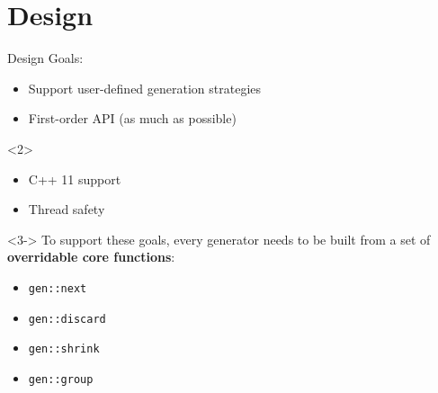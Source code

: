 \section{Design}

\begin{frame}[t]{\halcheck{} \textemdash{} Design}
  Goals:
  \begin{itemize}
    \item Support user-defined generation strategies
    \item First-order API (as much as possible)
  \end{itemize}

  \begin{onlyenv}<2>
    \begin{itemize}
      \item C++ 11 support
      \item Thread safety
    \end{itemize}
  \end{onlyenv}

  \begin{onlyenv}<3->
    To support these goals, every generator needs to be built from a set of \textbf{overridable core functions}:

    \begin{itemize}
      \item<4-> \texttt{gen::next}
      \item<4-> \texttt{gen::discard}
      \item<4-> \texttt{gen::shrink}
      \item<4-> \texttt{gen::group}
    \end{itemize}
  \end{onlyenv}
\end{frame}

